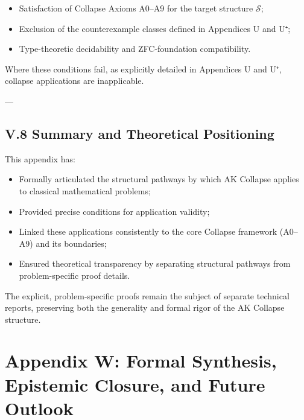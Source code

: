 \documentclass[11pt]{article}
\begin{document}
\begin{itemize}
    \item Satisfaction of Collapse Axioms A0–A9 for the target structure $\mathcal{S}$;
    \item Exclusion of the counterexample classes defined in Appendices U and U⁺;
    \item Type-theoretic decidability and ZFC-foundation compatibility.
\end{itemize}

Where these conditions fail, as explicitly detailed in Appendices U and U⁺, collapse applications are inapplicable.

---

\subsection*{V.8 Summary and Theoretical Positioning}

This appendix has:

\begin{itemize}
    \item Formally articulated the structural pathways by which AK Collapse applies to classical mathematical problems;
    \item Provided precise conditions for application validity;
    \item Linked these applications consistently to the core Collapse framework (A0–A9) and its boundaries;
    \item Ensured theoretical transparency by separating structural pathways from problem-specific proof details.
\end{itemize}

The explicit, problem-specific proofs remain the subject of separate technical reports, preserving both the generality and formal rigor of the AK Collapse structure.




\section*{Appendix W: Formal Synthesis, Epistemic Closure, and Future Outlook}
\end{document}
